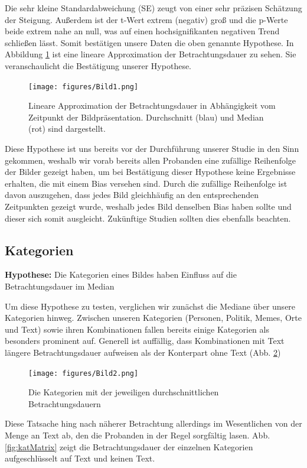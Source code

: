 \documentclass[
    language=german, %
    thesis=seminar, %
    supervisor=postdoc, %
    multiauthor=true, %
    ]{settings/csssa-thesis}
\begin{document}
Die sehr kleine Standardabweichung (SE) zeugt von einer sehr präzisen Schätzung der Steigung.  
Au{\ss}erdem ist der t-Wert extrem (negativ) gro{\ss} und die p-Werte beide extrem nahe an null,
was auf einen hochsignifikanten negativen Trend schlie{\ss}en lässt. Somit bestätigen unsere
Daten die oben genannte Hypothese. In Abbildung \ref{fig:lineareAppox} ist eine lineare Approximation der
Betrachtungsdauer zu sehen. Sie veranschaulicht die Bestätigung unserer Hypothese. 

\begin{figure}[h]
    \centering
    \texttt{[image: figures/Bild1.png]}
    \caption{Lineare Approximation der Betrachtungsdauer in Abhängigkeit vom Zeitpunkt der Bildpräsentation. Durchschnitt (blau) und Median (rot) sind dargestellt.}
    \label{fig:lineareAppox}
\end{figure}

Diese Hypothese ist uns bereits vor der Durchführung unserer Studie in den Sinn gekommen, 
weshalb wir vorab bereits allen Probanden eine zufällige Reihenfolge der Bilder gezeigt haben, 
um bei Bestätigung dieser Hypothese keine Ergebnisse erhalten, die mit einem Bias versehen sind. 
Durch die zufällige Reihenfolge ist davon auszugehen, dass jedes Bild gleichhäufig an den entsprechenden 
Zeitpunkten gezeigt wurde, weshalb jedes Bild denselben Bias haben sollte und dieser sich somit ausgleicht. 
Zukünftige Studien sollten dies ebenfalls beachten. 

\subsection{Kategorien}
\textbf{Hypothese:} Die Kategorien eines Bildes haben Einfluss auf die Betrachtungsdauer im Median 

Um diese Hypothese zu testen, verglichen wir zunächst die Mediane über unsere Kategorien hinweg. 
Zwischen unseren Kategorien (Personen, Politik, Memes, Orte und Text) sowie ihren Kombinationen 
fallen bereits einige Kategorien als besonders prominent auf. Generell ist auffällig, dass 
Kombinationen mit Text längere Betrachtungsdauer aufweisen als der Konterpart ohne Text (Abb. \ref{fig:katDauer}) 

\begin{figure}[htbp]
    \centering
    \texttt{[image: figures/Bild2.png]}
    \caption{Die Kategorien mit der jeweiligen durchschnittlichen Betrachtungsdauern}\label{fig:katDauer}
\end{figure}


Diese Tatsache hing nach näherer Betrachtung allerdings im Wesentlichen von der Menge an Text ab,
den die Probanden in der Regel sorgfältig lasen. Abb. \ref{fig:katMatrix} zeigt die Betrachtungsdauer der einzelnen 
Kategorien aufgeschlüsselt auf Text und keinen Text. 
\end{document}

